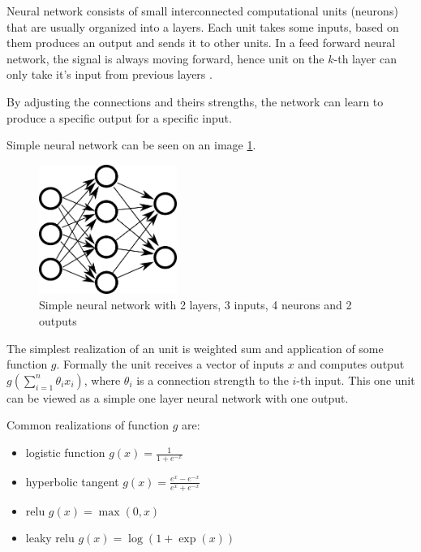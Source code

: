     Neural network consists of small interconnected computational units (neurons) that are usually organized into a layers.
    Each unit takes some inputs, based on them produces an output and sends it to other units. 
    In a feed forward neural network, the signal is always moving forward,
    hence unit on the $k$-th layer can only take it's input from previous layers \cite{Goodfellow-et-al-2016}.
    
    By adjusting the connections and theirs strengths, the network can learn to produce a specific output for a specific input.
    
    Simple neural network can be seen on an image \ref{obr:siet}.
    
    \begin{figure}[h]
    \centerline{\includegraphics[width=0.4\textwidth]{images/neural_network}}
    \caption[Simple neural network with 2 layers, 3 inputs, 4 neurons and 2 outputs]{Simple neural network with 2 layers, 3 inputs, 4 neurons and 2 outputs\*} %
    \label{obr:siet}
    \end{figure}
    
    The simplest realization of an unit is weighted sum and application of some function $g$. 
    Formally the unit receives a vector of inputs $x$ and computes output $g(\sum_{i=1}^n \theta_i x_i)$, 
    where $\theta_i$ is a connection strength to the $i$-th input.
    This one unit can be viewed as a simple one layer neural network with one output.
    
    Common realizations of function $g$ are: 
    \begin{itemize}
        \item logistic function $g(x) = \frac{1}{1+e^{-x}}$
        \item hyperbolic tangent $g(x)=\frac{e^x-e^{-x}}{e^x+e^{-x}}$
        \item relu $g(x) = \max(0,x)$ 
        \item leaky relu $g(x)=\log(1+\exp(x))$
    \end{itemize}
    

